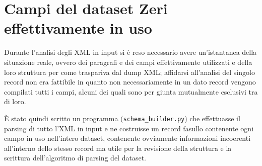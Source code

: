 \chapter{Campi del dataset Zeri effettivamente in uso}

Durante l'analisi degli XML in input si è reso necessario avere un'istantanea della situazione reale, ovvero dei paragrafi e dei campi effettivamente utilizzati e della loro struttura per come traspariva dal dump XML; affidarsi all'analisi del singolo record non era fattibile in quanto non necessariamente in un dato record vengono compilati tutti i campi, alcuni dei quali sono per giunta mutualmente esclusivi tra di loro.

È stato quindi scritto un programma (\texttt{schema\_builder.py}) che effettuasse il parsing di tutto l'XML in input e ne costruisse un record fasullo contenente ogni campo in uso nell'intero dataset, contenente ovviamente informazioni incoerenti all'interno dello stesso record ma utile per la revisione della struttura e la scrittura dell'algoritmo di parsing del dataset.



